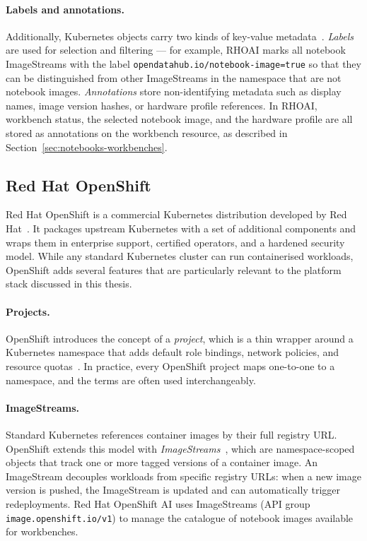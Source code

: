 \documentclass[
  digital,     %
  oneside,     %
  nosansbold,  %
  nocolorbold, %
  lof,         %
  lot,         %
]{fithesis4}
\begin{document}
\paragraph{Labels and annotations.}
Additionally, Kubernetes objects carry two kinds of key-value
metadata~\parencite{kubernetes-labels}. \emph{Labels} are used for selection
and filtering --- for example, RHOAI marks all notebook ImageStreams with the
label \texttt{opendatahub.io/notebook-image=true} so that they can be
distinguished from other ImageStreams in the namespace that are not notebook
images. \emph{Annotations} store
non-identifying metadata such as display names, image version hashes, or
hardware profile references. In RHOAI, workbench status, the selected notebook
image, and the hardware profile are all stored as annotations on the workbench
resource, as described in Section~\ref{sec:notebooks-workbenches}.

\subsection{Red Hat OpenShift}
\label{subsec:openshift}

Red Hat OpenShift is a commercial Kubernetes distribution developed by
Red Hat~\parencite{openshift-docs}. It packages upstream Kubernetes with a
set of additional components and wraps them in enterprise support,
certified operators, and a hardened security model. While any standard
Kubernetes cluster can run containerised workloads, OpenShift adds several
features that are particularly relevant to the platform stack discussed in this
thesis.

\paragraph{Projects.}
OpenShift introduces the concept of a \emph{project}, which is a thin wrapper
around a Kubernetes namespace that adds default role bindings, network
policies, and resource quotas~\parencite{openshift-projects}. In practice,
every OpenShift project maps one-to-one to a namespace, and the terms are often
used interchangeably.

\paragraph{ImageStreams.}
Standard Kubernetes references container images by their full registry URL.
OpenShift extends this model with
\emph{ImageStreams}~\parencite{openshift-imagestreams}, which are
namespace-scoped objects that track one or more tagged versions of a container
image. An
ImageStream decouples workloads from specific registry URLs: when a new image
version is pushed, the ImageStream is updated and can automatically trigger
redeployments. Red Hat OpenShift AI uses ImageStreams (API group
\texttt{image.openshift.io/v1}) to manage the catalogue of notebook images
available for workbenches.
\end{document}
